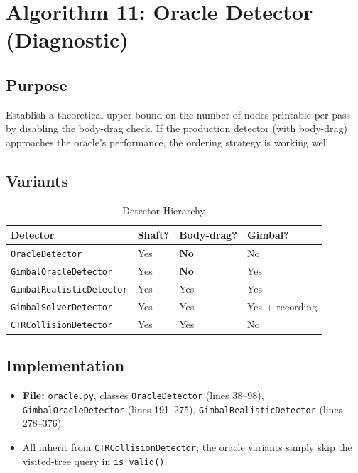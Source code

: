 \documentclass[11pt,a4paper]{article}
\newcommand{\filename}[1]{\texttt{\textcolor{accentblue}{#1}}}
\newcommand{\funcname}[1]{\texttt{\textcolor{codepurple}{#1}}}
\begin{document}
\section{Algorithm 11: Oracle Detector (Diagnostic)}
\label{sec:oracle}

\subsection{Purpose}

Establish a theoretical upper bound on the number of nodes printable per pass by disabling the body-drag check. If the production detector (with body-drag) approaches the oracle's performance, the ordering strategy is working well.

\subsection{Variants}

\begin{table}[H]
\centering
\caption{Detector Hierarchy}
\begin{tabular}{llll}
\toprule
\textbf{Detector} & \textbf{Shaft?} & \textbf{Body-drag?} & \textbf{Gimbal?} \\
\midrule
\texttt{OracleDetector} & Yes & \textbf{No} & No \\
\texttt{GimbalOracleDetector} & Yes & \textbf{No} & Yes \\
\texttt{GimbalRealisticDetector} & Yes & Yes & Yes \\
\texttt{GimbalSolverDetector} & Yes & Yes & Yes + recording \\
\texttt{CTRCollisionDetector} & Yes & Yes & No \\
\bottomrule
\end{tabular}
\end{table}

\subsection{Implementation}

\begin{itemize}[nosep]
    \item \textbf{File:} \filename{oracle.py}, classes \texttt{OracleDetector} (lines 38--98), \texttt{GimbalOracleDetector} (lines 191--275), \texttt{GimbalRealisticDetector} (lines 278--376).
    \item All inherit from \texttt{CTRCollisionDetector}; the oracle variants simply skip the visited-tree query in \funcname{is\_valid()}.
\end{itemize}
\end{document}
